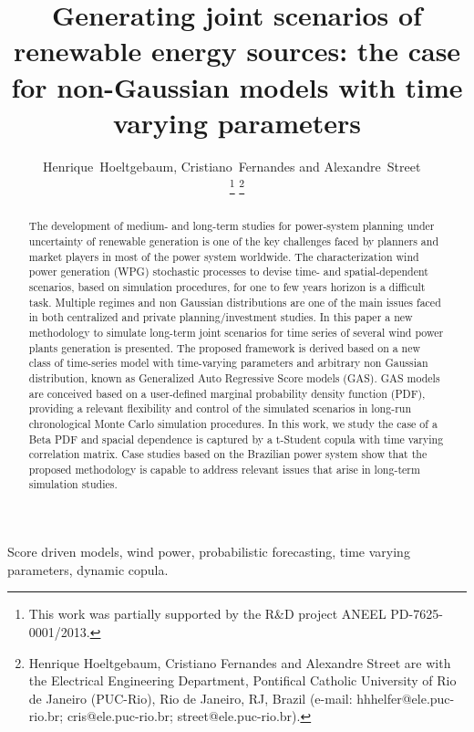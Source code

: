 \documentclass[a4paper]{IEEEtran}
\begin{document}
\title{Generating joint scenarios of renewable energy sources: the case for non-Gaussian models with time varying parameters}

\author{Henrique~Hoeltgebaum,
		Cristiano~Fernandes and
		Alexandre~Street  ~
	   

\thanks{This work was partially supported by the R\&D project ANEEL PD-7625-0001/2013.}
\thanks{Henrique Hoeltgebaum, Cristiano Fernandes and Alexandre Street are with the Electrical Engineering Department, Pontifical Catholic University of Rio de Janeiro (PUC-Rio), Rio de Janeiro, RJ, Brazil (e-mail: \mbox{hhhelfer@ele.puc-rio.br}; \mbox{cris@ele.puc-rio.br}; \mbox{street@ele.puc-rio.br}).}
}


\maketitle
\begin{abstract}
	The development of medium- and long-term studies for power-system planning under uncertainty of renewable generation is one of the key challenges faced by planners and market players in most of the power system worldwide. The characterization wind power generation (WPG) stochastic processes to devise time- and spatial-dependent scenarios, based on simulation procedures, for one to few years horizon is a difficult task. Multiple regimes and non Gaussian distributions are one of the main issues faced in both centralized and private planning/investment studies. In this paper a new methodology to simulate long-term joint scenarios for time series of several wind power plants generation is presented. The proposed framework is derived based on a new class of time-series model with time-varying parameters and arbitrary non Gaussian distribution, known as Generalized Auto Regressive Score models (GAS). GAS models are conceived based on a user-defined marginal probability density function (PDF), providing a relevant flexibility and control of the simulated scenarios in long-run chronological Monte Carlo simulation procedures. In this work, we study the case of a Beta PDF and spacial dependence is captured by a t-Student copula with time varying correlation matrix. Case studies based on the Brazilian power system show that the proposed methodology is capable to address relevant issues that arise in long-term simulation studies. 
	
\end{abstract}

\begin{IEEEkeywords}
	Score driven models, wind power, probabilistic forecasting, time varying parameters, dynamic copula.
\end{IEEEkeywords}
\end{document}
